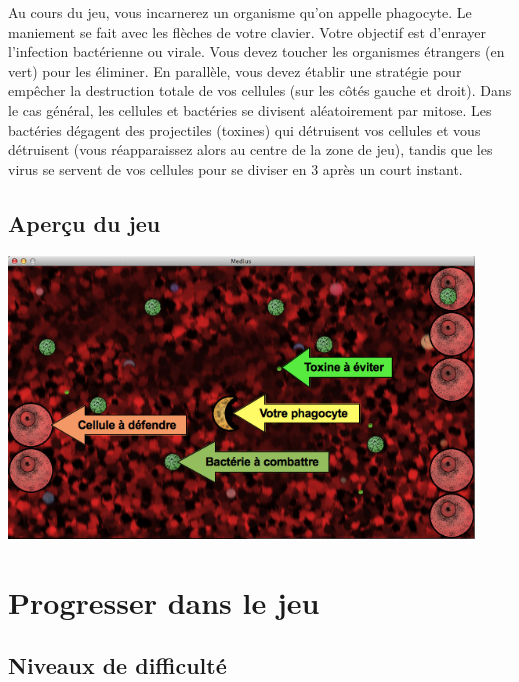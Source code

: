 \documentclass{article}
\begin{document}
Au cours du jeu, vous incarnerez un organisme qu'on appelle phagocyte. Le maniement se fait avec les flèches de votre clavier.
\newline\newline
Votre objectif est d'enrayer l'infection bactérienne ou virale. Vous devez toucher les organismes étrangers (en vert) pour les éliminer.
\newline\newline
En parallèle, vous devez établir une stratégie pour empêcher la destruction totale de vos cellules (sur les côtés gauche et droit).
\newline\newline
Dans le cas général, les cellules et bactéries se divisent aléatoirement par mitose.
\newline\newline
Les bactéries dégagent des projectiles (toxines) qui détruisent vos cellules et vous détruisent (vous réapparaissez alors au centre de la zone de jeu), tandis que les virus se servent de vos cellules pour se diviser en 3 après un court instant.
\newline\newline

\subsection{Aperçu du jeu}

\centerline{\includegraphics[height=7.5cm]{game_help.png}}
\strut\newline

\section{Progresser dans le jeu}

\subsection{Niveaux de difficulté}
\end{document}
